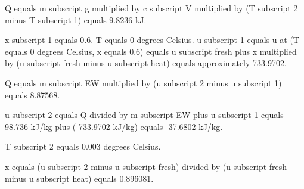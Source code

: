 Q equals m subscript g multiplied by c subscript V multiplied by (T subscript 2 minus T subscript 1) equals 9.8236 kJ.  

x subscript 1 equals 0.6.  
T equals 0 degrees Celsius.  
u subscript 1 equals u at (T equals 0 degrees Celsius, x equals 0.6) equals u subscript fresh plus x multiplied by (u subscript fresh minus u subscript heat) equals approximately 733.9702.  

Q equals m subscript EW multiplied by (u subscript 2 minus u subscript 1) equals 8.87568.  

u subscript 2 equals Q divided by m subscript EW plus u subscript 1 equals 98.736 kJ/kg plus (-733.9702 kJ/kg) equals -37.6802 kJ/kg.  

T subscript 2 equals 0.003 degrees Celsius.  

x equals (u subscript 2 minus u subscript fresh) divided by (u subscript fresh minus u subscript heat) equals 0.896081.